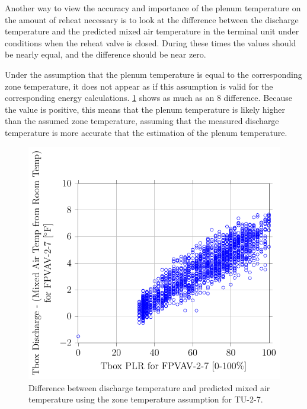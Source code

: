 Another way to view the accuracy and importance of the plenum
temperature on the amount of reheat necessary is to look at the
difference between the discharge temperature and the predicted mixed air
temperature in the terminal unit under conditions when the reheat valve
is closed.  During these times the values should be nearly equal, and the
difference should be near zero. 

Under the assumption that the plenum temperature is equal to the
corresponding zone temperature, it does not appear as if this assumption
is valid for the corresponding energy calculations. \figref{}
\ref{fig:2017-01-09-1412-TboxDischargeMixedAirTempfromRoomTempforFPVAV27vsTboxPLRforFPVAV27}
shows as much as an \SI{8}{\degreeF} difference. Because the value is
positive, this means that the plenum temperature is likely higher than
the assumed zone temperature, assuming that the measured discharge
temperature is more accurate that the estimation of the plenum
temperature. 

\begin{figure}
\centering
\includegraphics[]{Plots/2017-01-09-1412-TboxDischargeMixedAirTempfromRoomTempforFPVAV27vsTboxPLRforFPVAV27.pdf}
\caption{Difference between discharge temperature and predicted mixed
air temperature using the zone temperature assumption for TU-2-7.}
\label{fig:2017-01-09-1412-TboxDischargeMixedAirTempfromRoomTempforFPVAV27vsTboxPLRforFPVAV27}
\end{figure}

